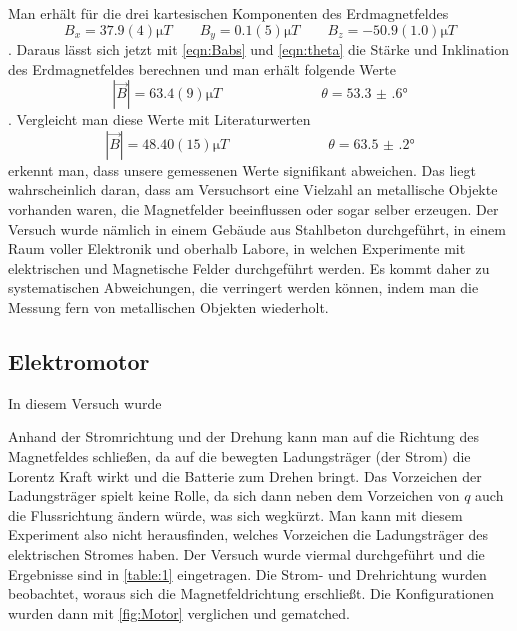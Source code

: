 Man erhält für die drei kartesischen Komponenten des Erdmagnetfeldes
\begin{equation}\label{eqn:Bxyz}
	B_x = 37.9(4) \unit{\micro T} \qquad B_y = 0.1(5) \unit{\micro T} \qquad B_z = -50.9(1.0) \unit{\micro T}
\end{equation}
. Daraus lässt sich jetzt mit \autoref{eqn:Babs} und \autoref{eqn:theta} die Stärke und Inklination des Erdmagnetfeldes berechnen und man erhält folgende Werte
\begin{equation}\label{eqn:results}
	|\vec{B}| = 63.4(9) \unit{\micro T} \hspace{3cm} \theta = \ang{53.3(6)}
\end{equation}
. Vergleicht man diese Werte mit Literaturwerten \cite{MagCal}
\begin{equation}\label{key}
	|\vec{B}| = 48.40(15) \unit{\micro T} \hspace{3cm} \theta = \ang{63.5(2)}
\end{equation}
erkennt man, dass unsere gemessenen Werte signifikant abweichen. Das liegt wahrscheinlich daran, dass am Versuchsort eine Vielzahl an metallische Objekte vorhanden waren, die Magnetfelder beeinflussen oder sogar selber erzeugen. Der Versuch wurde nämlich in einem Gebäude aus Stahlbeton durchgeführt, in einem Raum voller Elektronik und oberhalb Labore, in welchen Experimente mit elektrischen und Magnetische Felder durchgeführt werden. Es kommt daher zu systematischen Abweichungen, die verringert werden können, indem man die Messung fern von metallischen Objekten wiederholt.

\subsection{Elektromotor}
In diesem Versuch wurde 

Anhand der Stromrichtung und der Drehung kann man auf die Richtung des Magnetfeldes schließen, da auf die bewegten Ladungsträger (der Strom) die Lorentz Kraft wirkt und die Batterie zum Drehen bringt. Das Vorzeichen der Ladungsträger spielt keine Rolle, da sich dann neben dem Vorzeichen von \( q \) auch die Flussrichtung ändern würde, was sich wegkürzt. Man kann mit diesem Experiment also nicht herausfinden, welches Vorzeichen die Ladungsträger des elektrischen Stromes haben. Der Versuch wurde viermal durchgeführt und die Ergebnisse sind in \autoref{table:1} eingetragen. Die Strom- und Drehrichtung wurden beobachtet, woraus sich die Magnetfeldrichtung erschließt. Die Konfigurationen wurden dann mit \autoref{fig:Motor} verglichen und gematched. 

